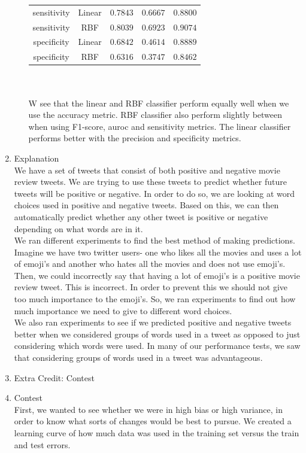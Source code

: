 \documentclass[11pt]{article}
\begin{document}
\begin{enumerate}
\begin{enumerate}[(a)]
\begin{tabular}{| c | c | c | c | c |}
sensitivity & Linear & $0.7843$ & $0.6667$ & $0.8800$ \\
sensitivity & RBF & $0.8039$ & $0.6923$ & $0.9074$ \\
specificity & Linear & $0.6842$ & $0.4614$ & $0.8889$ \\
specificity & RBF & $0.6316$ & $0.3747$ & $0.8462$ \\
\hline
\end{tabular} \\ \\
W see that the linear and RBF classifier perform equally well when we use the accuracy metric. RBF classifier also perform slightly between when using F1-score, auroc and sensitivity metrics. The linear classifier performs better with the precision and specificity metrics. 
\end{enumerate}
\item Explanation \\
We have a set of tweets that consist of both positive and negative movie review tweets. We are trying to use these tweets to predict whether future tweets will be positive or negative. In order to do so, we are looking at word choices used in positive and negative tweets. Based on this, we can then automatically predict whether any other tweet is positive or negative depending on what words are in it. \\
We ran different experiments to find the best method of making predictions. Imagine we have two twitter users- one who likes all the movies and uses a lot of emoji's and another who hates all the movies and does not use emoji's. Then, we could incorrectly say that having a lot of emoji's is a positive movie review tweet. This is incorrect. In order to prevent this we should not give too much importance to the emoji's. So, we ran experiments to find out how much importance we need to give to different word choices. \\
We also ran experiments to see if we predicted positive and negative tweets better when we considered groups of words used in a tweet as opposed to just considering which words were used. In many of our performance tests, we saw that considering groups of words used in a tweet was advantageous. 
\item Extra Credit: Contest
\item Contest\\
First, we wanted to see whether we were in high bias or high variance, in order to know what sorts of changes
would be best to pursue. We created a learning curve of how much data was used in the training set versus
the train and test errors.


\end{enumerate}
\end{document}
